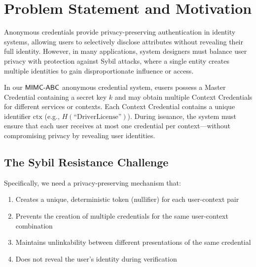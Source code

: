

\section{Problem Statement and Motivation}

Anonymous credentials provide privacy-preserving authentication in identity systems, allowing users to selectively disclose attributes without revealing their full identity. However, in many applications, system designers must balance user privacy with protection against Sybil attacks, where a single entity creates multiple identities to gain disproportionate influence or access.

In our $\mathsf{MIMC\text{-}ABC}$ anonymous credential system, eusers possess a Master Credential containing a secret key $k$ and may obtain multiple Context Credentials for different services or contexts. Each Context Credential contains a unique identifier $\text{ctx}$ (e.g., $H(\text{``DriverLicense''})$). During issuance, the system must ensure that each user receives at most one credential per context—without compromising privacy by revealing user identities.

\subsection{The Sybil Resistance Challenge}

Specifically, we need a privacy-preserving mechanism that:
\begin{enumerate}
    \item Creates a unique, deterministic token (nullifier) for each user-context pair
    \item Prevents the creation of multiple credentials for the same user-context combination
    \item Maintains unlinkability between different presentations of the same credential
    \item Does not reveal the user's identity during verification
\end{enumerate}

